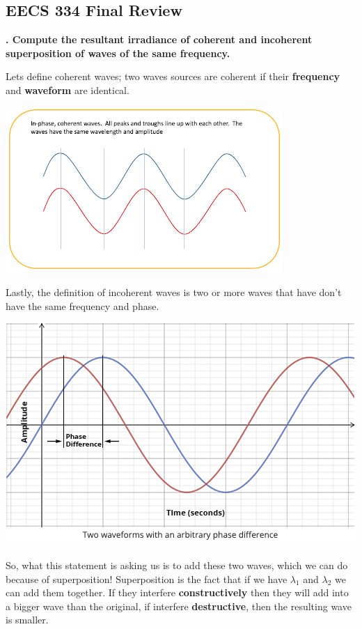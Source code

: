 \documentclass[10pt]{article}
\newcounter{counter}
\newcommand*{\question}[1]{
            \textbf{\thecounter. #1} \hfill
            \addtocounter{counter}{1}
            
            \newblock

            }
\begin{document}
\begin{center}
    \section*{EECS 334 Final Review}
\end{center}
\question{Compute the resultant irradiance of coherent and incoherent superposition of waves of the same frequency.}
Lets define coherent waves; two waves sources are coherent if their \textbf{frequency} and \textbf{waveform} are identical.
\begin{center}
    \includegraphics*[scale = 1]{imgs/coherent-wave.png}    
\end{center}

Lastly, the definition of incoherent waves is two or more waves that have don't have the same frequency and phase.

\begin{center}
    \includegraphics*[scale = .5]{imgs/phase-difference.png}
\end{center}

\newpage 

So, what this statement is asking us is to add these two waves, which we can do because of superposition! Superposition is the fact that if we have $\lambda_1$ and $\lambda_2$ we can add them together. If they interfere \textbf{constructively} then they will add into a bigger wave than the original, if interfere \textbf{destructive}, then the resulting wave is smaller.
\end{document}
